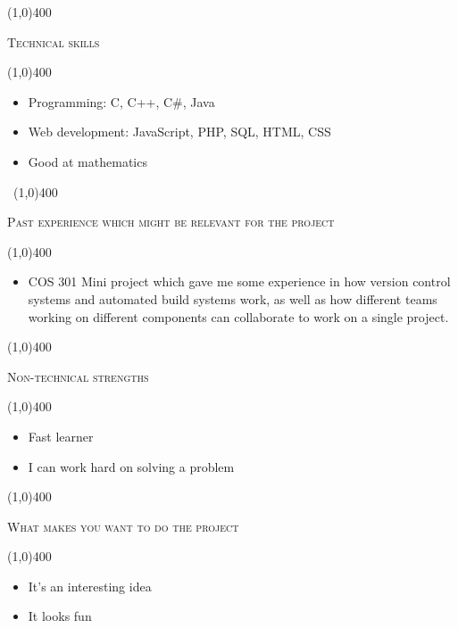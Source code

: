 \documentclass[12pt,a4paper]{report}
\begin{document}
	\begin{center}
	
	\line(1,0){400}\\
	{\scshape\large Technical skills\par}
	\line(1,0){400}\\
	\end{center}
		\begin{itemize}
\item Programming: C, C++, C\#, Java
\item Web development: JavaScript, PHP, SQL, HTML, CSS
\item Good at mathematics
\end{itemize}
\newpage
\begin{center}
	\vspace*{-3cm}\
	\line(1,0){400}\\
	{\scshape\large Past experience which might be relevant for the project\par}
	\line(1,0){400}\\
	\end{center}
		\begin{itemize}
\item COS 301 Mini project which gave me some experience in how version control
systems and automated build systems work, as well as how different teams working
on different components can collaborate to work on a single project.

\end{itemize}

	\begin{center}
	
	\line(1,0){400}\\
	{\scshape\large Non-technical strengths\par}
	\line(1,0){400}\\
	\end{center}
		\begin{itemize}
\item Fast learner
\item I can work hard on solving a problem
\end{itemize}

\begin{center}
	
	\line(1,0){400}\\
	{\scshape\large What makes you want to do the project\par}
	\line(1,0){400}\\
	\end{center}
		\begin{itemize}
\item It's an interesting idea
\item It looks fun
\end{itemize}
\end{document}

